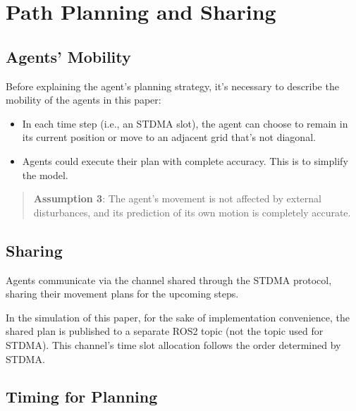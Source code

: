 \section{Path Planning and Sharing}

\subsection{Agents' Mobility}

Before explaining the agent's planning strategy, it's necessary to describe the mobility of the agents in this paper:
\begin{itemize}
    \item In each time step (i.e., an STDMA slot), the agent can choose to remain in its current position or move to an adjacent grid that's not diagonal.
    \item Agents could execute their plan with complete accuracy. This is to simplify the model.
\end{itemize}

\begin{quotation}
    \textbf{Assumption 3}: 
    The agent's movement is not affected by external disturbances, and its prediction of its own motion is completely accurate.
\end{quotation}


\subsection{Sharing}

Agents communicate via the channel shared through the STDMA protocol, sharing their movement plans for the upcoming steps.

In the simulation of this paper, for the sake of implementation convenience, the shared plan is published to a separate ROS2 topic (not the topic used for STDMA). This channel's time slot allocation follows the order determined by STDMA.

\subsection{Timing for Planning}




